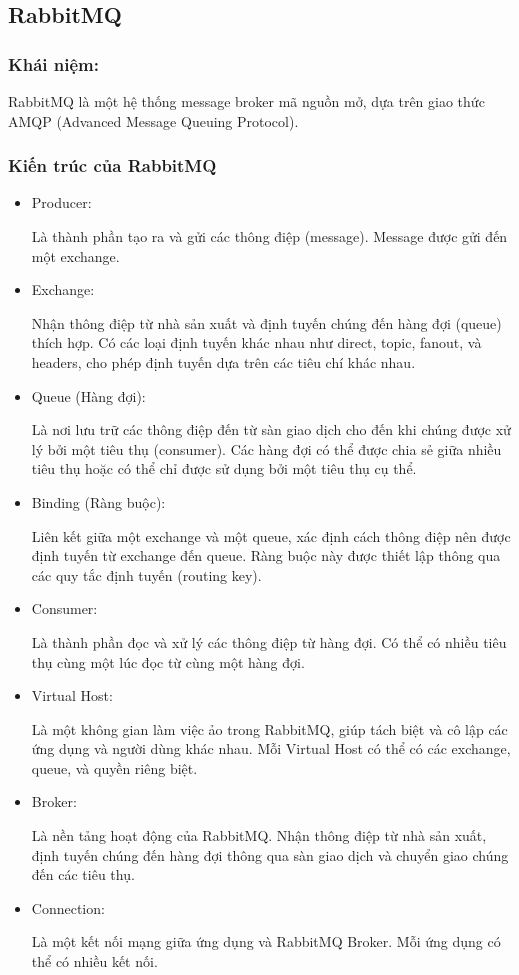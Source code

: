 \subsection{RabbitMQ}
\subsubsection{Khái niệm:}
\indent RabbitMQ là một hệ thống message broker mã nguồn mở, dựa trên giao thức AMQP (Advanced Message Queuing Protocol).
\subsubsection{Kiến trúc của RabbitMQ}
\begin{itemize}
    \item Producer:

Là thành phần tạo ra và gửi các thông điệp (message).
Message được gửi đến một exchange.
    \item Exchange:

Nhận thông điệp từ nhà sản xuất và định tuyến chúng đến hàng đợi (queue) thích hợp.
Có các loại định tuyến khác nhau như direct, topic, fanout, và headers, cho phép định tuyến dựa trên các tiêu chí khác nhau.
    \item Queue (Hàng đợi):

Là nơi lưu trữ các thông điệp đến từ sàn giao dịch cho đến khi chúng được xử lý bởi một tiêu thụ (consumer).
Các hàng đợi có thể được chia sẻ giữa nhiều tiêu thụ hoặc có thể chỉ được sử dụng bởi một tiêu thụ cụ thể.
    \item Binding (Ràng buộc):

Liên kết giữa một exchange và một queue, xác định cách thông điệp nên được định tuyến từ exchange đến queue.
Ràng buộc này được thiết lập thông qua các quy tắc định tuyến (routing key).
    \item Consumer:

Là thành phần đọc và xử lý các thông điệp từ hàng đợi.
Có thể có nhiều tiêu thụ cùng một lúc đọc từ cùng một hàng đợi.
    \item Virtual Host:

Là một không gian làm việc ảo trong RabbitMQ, giúp tách biệt và cô lập các ứng dụng và người dùng khác nhau.
Mỗi Virtual Host có thể có các exchange, queue, và quyền riêng biệt.
    \item Broker:

Là nền tảng hoạt động của RabbitMQ.
Nhận thông điệp từ nhà sản xuất, định tuyến chúng đến hàng đợi thông qua sàn giao dịch và chuyển giao chúng đến các tiêu thụ.
    \item Connection:

Là một kết nối mạng giữa ứng dụng và RabbitMQ Broker.
Mỗi ứng dụng có thể có nhiều kết nối.
\end{itemize}

